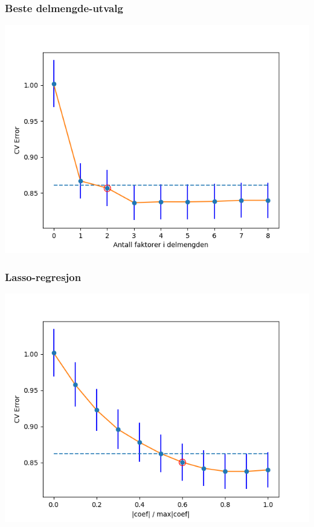 \documentclass[aspectratio=169]{beamer}
\begin{document}
\begin{frame}
  \frametitle{Beste delmengde-utvalg}
  \begin{center}
    \includegraphics[height=0.8\textheight]{best_subset_CV.png}
  \end{center}
\end{frame}

\begin{frame}
  \frametitle{Lasso-regresjon}
  \begin{center}
    \includegraphics[height=0.8\textheight]{lasso_CV.png}
  \end{center}
\end{frame}
\end{document}

